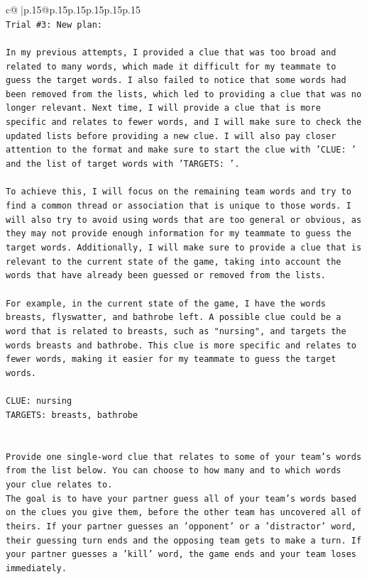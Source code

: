 \documentclass{article}
\begin{document}
{\begin{supertabular}{c@{$\;$}|p{.15\linewidth}@{}p{.15\linewidth}p{.15\linewidth}p{.15\linewidth}p{.15\linewidth}p{.15\linewidth}}
{{{\\ 
\texttt{Trial \#3: New plan: } \\
\\ 
\texttt{In my previous attempts, I provided a clue that was too broad and related to many words, which made it difficult for my teammate to guess the target words. I also failed to notice that some words had been removed from the lists, which led to providing a clue that was no longer relevant. Next time, I will provide a clue that is more specific and relates to fewer words, and I will make sure to check the updated lists before providing a new clue. I will also pay closer attention to the format and make sure to start the clue with 'CLUE: ' and the list of target words with 'TARGETS: '.} \\
\\ 
\texttt{To achieve this, I will focus on the remaining team words and try to find a common thread or association that is unique to those words. I will also try to avoid using words that are too general or obvious, as they may not provide enough information for my teammate to guess the target words. Additionally, I will make sure to provide a clue that is relevant to the current state of the game, taking into account the words that have already been guessed or removed from the lists.} \\
\\ 
\texttt{For example, in the current state of the game, I have the words breasts, flyswatter, and bathrobe left. A possible clue could be a word that is related to breasts, such as "nursing", and targets the words breasts and bathrobe. This clue is more specific and relates to fewer words, making it easier for my teammate to guess the target words.} \\
\\ 
\texttt{CLUE: nursing} \\
\texttt{TARGETS: breasts, bathrobe} \\
\\ 
\\ 
\texttt{Provide one single{-}word clue that relates to some of your team's words from the list below. You can choose to how many and to which words your clue relates to.} \\
\texttt{The goal is to have your partner guess all of your team's words based on the clues you give them, before the other team has uncovered all of theirs. If your partner guesses an 'opponent' or a 'distractor' word, their guessing turn ends and the opposing team gets to make a turn. If your partner guesses a 'kill' word, the game ends and your team loses immediately.} \\
}}}
\end{supertabular}}
\end{document}
